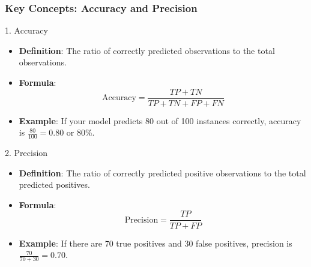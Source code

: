 \documentclass[aspectratio=169]{beamer}
\begin{document}
\begin{frame}[fragile]
    \frametitle{Key Concepts: Accuracy and Precision}
    \begin{block}{1. Accuracy}
        \begin{itemize}
            \item \textbf{Definition}: The ratio of correctly predicted observations to the total observations.
            \item \textbf{Formula}:
            \begin{equation}
                \text{Accuracy} = \frac{TP + TN}{TP + TN + FP + FN}
            \end{equation}
            \item \textbf{Example}: If your model predicts 80 out of 100 instances correctly, accuracy is \( \frac{80}{100} = 0.80 \) or 80\%.
        \end{itemize}
    \end{block}
    
    \begin{block}{2. Precision}
        \begin{itemize}
            \item \textbf{Definition}: The ratio of correctly predicted positive observations to the total predicted positives.
            \item \textbf{Formula}:
            \begin{equation}
                \text{Precision} = \frac{TP}{TP + FP}
            \end{equation}
            \item \textbf{Example}: If there are 70 true positives and 30 false positives, precision is \( \frac{70}{70 + 30} = 0.70 \).
        \end{itemize}
    \end{block}
\end{frame}
\end{document}
